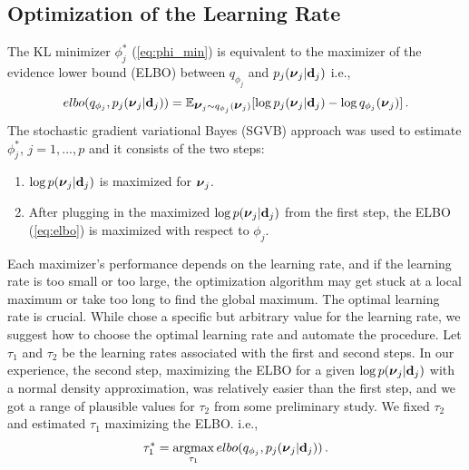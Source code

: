 \documentclass[%
 reprint,
 amsmath,amssymb,
 aps,
]{revtex4-2}
\DeclareMathOperator{\argmax}{argmax} %
\begin{document}


\subsection{Optimization of the Learning Rate}\label{subsec:learningrate}

The KL minimizer $\phi^*_j$ (\ref{eq:phi_min}) is equivalent to the maximizer of the evidence lower bound (ELBO) between $q_{\phi_j}$ and $p_j(\mbox{\boldmath $\nu$}_j|{\bf d}_j)$ i.e.,  
\begin{equation}\label{eq:elbo}
elbo(q_{\phi_j},p_j(\mbox{\boldmath $\nu$}_j|{\bf d}_j)) = \mathbb{E}_{\mbox{\boldmath $\nu$}_j\sim q_{\phi_j}(\mbox{\boldmath $\nu$}_j)}[\log p_j(\mbox{\boldmath $\nu$}_j|{\bf d}_j)-\log q_{\phi_j}(\mbox{\boldmath $\nu$}_j)] \,.    
\end{equation}
The stochastic gradient variational Bayes (SGVB) approach was used to estimate $\phi^*_j$, $j=1,...,p$ and it consists of the two steps:
\begin{enumerate}
    \item 
 $\log p(\mbox{\boldmath $\nu$}_j|{\bf d}_j)$ is maximized for $\mbox{\boldmath $\nu$}_j$. 
 \item After plugging in  the maximized $\log p(\mbox{\boldmath $\nu$}_j|{\bf d}_j)$ from the first step, the ELBO (\ref{eq:elbo}) is maximized with respect to $\phi_j$. 
 \end{enumerate}
 Each maximizer's performance depends on the learning rate, and if the learning rate is too small or too large, the optimization algorithm may get stuck at a local maximum or take too long to find the global maximum. The optimal learning rate is crucial. While \cite{Hu2023} chose a specific but arbitrary value for the learning rate,
we suggest how to choose the optimal learning rate and automate the procedure. Let $\tau_1$ and $\tau_2$ be the learning rates associated with the first and second steps. In our experience, the second step, maximizing the ELBO for a given $\log p(\mbox{\boldmath $\nu$}_j|{\bf d}_j)$ with a normal density approximation, was relatively easier than the first step, and we got a range of plausible values for $\tau_2$ from some preliminary study. We fixed $\tau_2$ and estimated $\tau_1$ maximizing the ELBO. i.e., 
\[ \tau_1^* = \argmax_{\tau_1} elbo(q_{\phi_j},p_j(\bnu_j|\d_j)) \,. \] 
\end{document}
